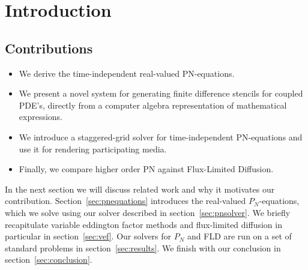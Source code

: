 \section{Introduction}


\subsection*{Contributions}
\begin{itemize}
	\item We derive the time-independent real-valued PN-equations.
	\item We present a novel system for generating finite difference stencils for coupled PDE's, directly from a computer algebra representation of mathematical expressions.
	\item We introduce a staggered-grid solver for time-independent PN-equations and use it for rendering participating media.
	\item Finally, we compare higher order PN against Flux-Limited Diffusion.
\end{itemize}


In the next section we will discuss related work and why it motivates our contribution. Section~\ref{sec:pnequations} introduces the real-valued $P_N$-equations, which we solve using our solver described in section~\ref{sec:pnsolver}. We briefly recapitulate variable eddington factor methods and flux-limited diffusion in particular in section~\ref{sec:vef}. Our solvers for $P_N$ and FLD are run on a set of standard problems in section~\ref{sec:results}. We finish with our conclusion in section~\ref{sec:conclusion}.